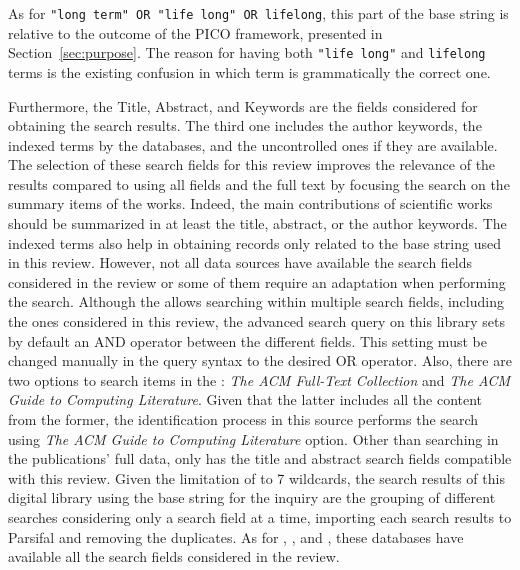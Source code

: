 As for \texttt{"long term" OR "life long" OR lifelong}, this part of the base string is relative to the outcome of the PICO framework, presented in Section~\ref{sec:purpose}. The reason for having both \texttt{"life long"} and \texttt{lifelong} terms is the existing confusion in which term is grammatically the correct one.

Furthermore, the Title, Abstract, and Keywords are the fields considered for obtaining the search results. The third one includes the author keywords, the indexed terms by the databases, and the uncontrolled ones if they are available. The selection of these search fields for this review improves the relevance of the results compared to using all fields and the full text by focusing the search on the summary items of the works. Indeed, the main contributions of scientific works should be summarized in at least the title, abstract, or the author keywords. The indexed terms also help in obtaining records only related to the base string used in this review.
However, not all data sources have available the search fields considered in the review or some of them require an adaptation when performing the search. 
Although the  allows searching within multiple search fields, including the ones considered in this review, the advanced search query on this library sets by default an AND operator between the different fields. This setting must be changed manually in the query syntax to the desired OR operator. Also, there are two options to search items in the : \textit{The ACM Full-Text Collection} and \textit{The ACM Guide to Computing Literature}. Given that the latter includes all the content from the former, the identification process in this source performs the search using \textit{The ACM Guide to Computing Literature} option.
Other than searching in the publications' full data,  only has the title and abstract search fields compatible with this review. Given the limitation of  to 7 wildcards, the search results of this digital library using the base string for the inquiry are the grouping of different searches considering only a search field at a time, importing each search results to Parsifal and removing the duplicates. As for , , and , these databases have available all the search fields considered in the review.

